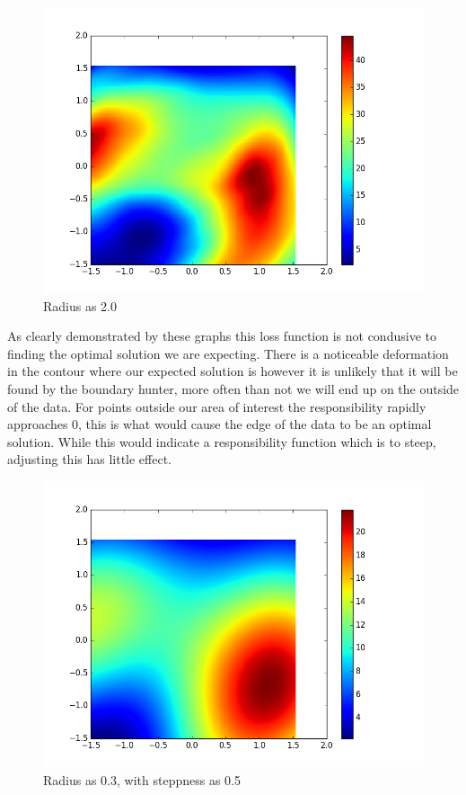 \documentclass{article}
\begin{document}
\begin{figure}[H]
  \centering
  \begin{minipage}[b]{0.8\textwidth}
    \includegraphics[width=\textwidth]{LossPlot-3.png}
    \caption{Radius as 2.0}
  \end{minipage}
  \hfill
\end{figure}

As clearly demonstrated by these graphs this loss function is not condusive to finding the optimal solution we are expecting.  There is a noticeable deformation in the contour where our expected solution is however it is unlikely that it will be found by the boundary hunter, more often than not we will end up on the outside of the data. For points outside our area of interest the responsibility rapidly approaches 0, this is what would cause the edge of the data to be an optimal solution. While this would indicate a responsibility function which is to steep, adjusting this has little effect.

\begin{figure}[H]
  \centering
  \begin{minipage}[b]{0.8\textwidth}
    \includegraphics[width=\textwidth]{LossPlot-4.png}
    \caption{Radius as 0.3, with steppness as 0.5}
  \end{minipage}
  \hfill
\end{figure}
\end{document}
